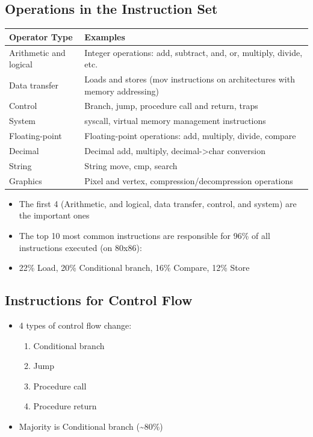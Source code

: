 \documentclass[11pt, a4paper]{article}
\theoremstyle{definition}
\theoremstyle{remark}
\begin{document}
\subsection{Operations in the Instruction Set}
\begin{center}
\begin{tabularx}{\textwidth}{l X}
\hline
\textbf{Operator Type} & \textbf{Examples} \\ 
\hline
Arithmetic and logical & Integer operations: add, subtract, and, or, multiply, divide, etc. \\
\hline 
Data transfer & Loads and stores (mov instructions on architectures with memory addressing) \\
\hline 
Control & Branch, jump, procedure call and return, traps \\
\hline 
System & syscall, virtual memory management instructions \\ 
\hline 
Floating-point & Floating-point operations: add, multiply, divide, compare \\ 
\hline 
Decimal & Decimal add, multiply, decimal->char conversion \\
\hline 
String & String move, cmp, search \\ 
\hline
Graphics & Pixel and vertex, compression/decompression operations \\
\hline
\end{tabularx}
\end{center}
\begin{itemize}
  \item The first 4 (Arithmetic, and logical, data transfer, control, and system) are the important ones 
  \item The top 10 most common instructions are responsible for 96\% of all instructions executed (on 80x86):
  \item 22\% Load, 20\% Conditional branch, 16\% Compare, 12\% Store  
\end{itemize}
\subsection{Instructions for Control Flow}
\begin{itemize}
  \item 4 types of control flow change:
  \begin{enumerate}
    \item Conditional branch
    \item Jump 
    \item Procedure call 
    \item Procedure return
  \end{enumerate}
  \item Majority is Conditional branch (\textasciitilde 80\%)
\end{itemize}
\end{document}
